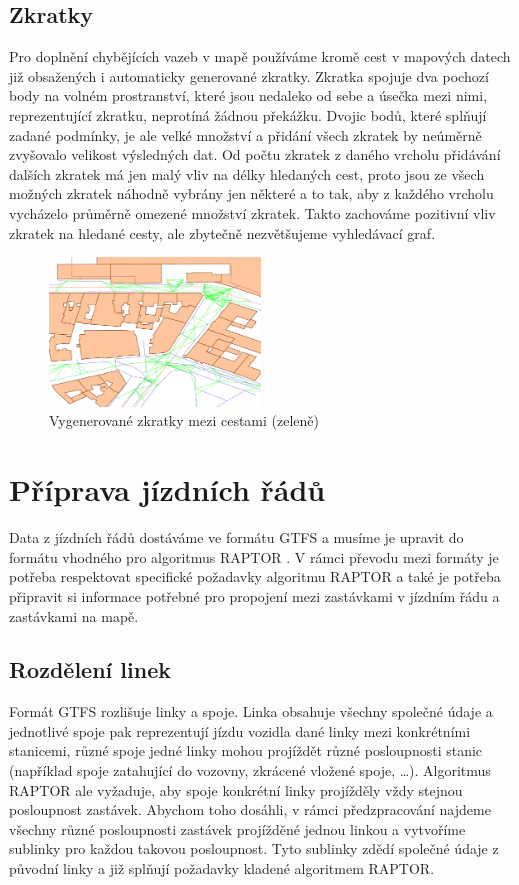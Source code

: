 \subsection{Zkratky}
Pro doplnění chybějících vazeb v mapě používáme kromě cest v mapových datech
již obsažených i automaticky generované zkratky. Zkratka spojuje dva pochozí
body na volném prostranství, které jsou nedaleko od sebe a úsečka mezi nimi,
reprezentující zkratku, neprotíná žádnou překážku. Dvojic bodů, které splňují
zadané podmínky, je ale velké množství a přidání všech zkratek by neúměrně
zvyšovalo velikost výsledných dat. Od počtu zkratek z daného vrcholu přidávání
dalších zkratek má jen malý vliv na délky hledaných cest, proto jsou ze všech
možných zkratek náhodně vybrány jen některé a to tak, aby z každého vrcholu
vycházelo průměrně omezené množství zkratek. Takto zachováme pozitivní vliv
zkratek na hledané cesty, ale zbytečně nezvětšujeme vyhledávací graf.
\begin{figure}
  \centering
    \includegraphics[width=0.5\textwidth]{../img/zkratky.pdf}
  \caption{Vygenerované zkratky mezi cestami (zeleně)}
  \label{fig:zkratky}
\end{figure}

\section{Příprava jízdních řádů}
Data z jízdních řádů dostáváme ve formátu GTFS \cite{GTFS} a musíme je
upravit do formátu vhodného pro algoritmus RAPTOR \cite{RAPTOR}. V rámci převodu
mezi formáty je potřeba respektovat specifické požadavky algoritmu RAPTOR a také
je potřeba připravit si informace potřebné pro propojení mezi zastávkami v
jízdním řádu a zastávkami na mapě.

\subsection{Rozdělení linek}
Formát GTFS rozlišuje linky a spoje. Linka obsahuje všechny společné údaje a
jednotlivé spoje pak reprezentují jízdu vozidla dané linky mezi konkrétními
stanicemi, různé spoje jedné linky mohou projíždět různé posloupnosti stanic
(například spoje zatahující do vozovny, zkrácené vložené spoje, \dots).
Algoritmus RAPTOR ale vyžaduje, aby spoje konkrétní linky projížděly vždy
stejnou posloupnost zastávek. Abychom toho dosáhli, v rámci předzpracování
najdeme všechny různé posloupnosti zastávek projížděné jednou linkou a vytvoříme
sublinky pro každou takovou posloupnost. Tyto sublinky zdědí společné údaje z
původní linky a již splňují požadavky kladené algoritmem RAPTOR. 

